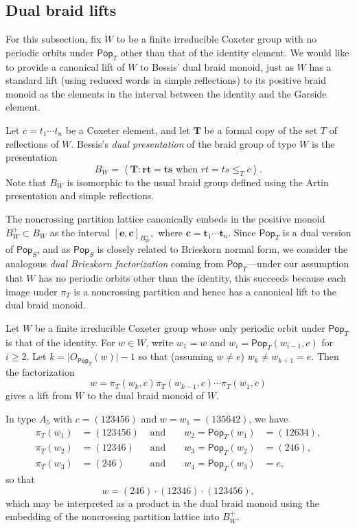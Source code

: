 \documentclass[ALCO,ThmDefs,Unicode,epreuves]{cedram}
\newcommand{\darkblue}{\color{darkblue}}
\newcommand{\defn}[1]{\emph{\darkblue #1}}
\newcommand{\pop}{\mathsf{Pop}}
\begin{document}
\subsection{Dual braid lifts}
\label{sec:lifts}
For this subsection, fix $W$ to be a finite irreducible Coxeter group with no periodic orbits under $\pop_T$ other than that of the identity element.  We would like to provide a canonical lift of $W$ to Bessis' dual braid monoid, just as $W$ has a standard lift (using reduced words in simple reflections) to its positive braid monoid as the elements in the interval between the identity and the Garside element.

Let $c=t_1\cdots t_n$ be a Coxeter element, and let $\mathbf{T}$ be a formal copy of the set $T$ of reflections of $W$. Bessis's \defn{dual presentation} of the braid group of type $W$ is the presentation
\[
B_W = \left\langle \mathbf{T} : \mathbf{r}\mathbf{t} = \mathbf{t}\mathbf{s} \text{ when } rt=ts \leq_T c\right \rangle.
\]
  Note that $B_W$ is isomorphic to the usual braid group defined using the Artin presentation and simple reflections.

The noncrossing partition lattice canonically embeds in the positive monoid $B^+_W \subset B_W$ as the interval $[\mathbf{e},\mathbf{c}]_{B^+_W},$ where $\mathbf{c} = \mathbf{t}_1\cdots \mathbf{t}_n$.    Since $\pop_T$ is a dual version of $\pop_S$, and as $\pop_S$ is closely related to Brieskorn normal form, we consider the analogous \defn{dual Brieskorn factorization} coming from $\pop_T$---under our assumption that $W$ has no periodic orbits other than the identity, this succeeds because each image under $\pi_T$ is a noncrossing partition and hence has a canonical lift to the dual braid monoid.

\begin{theorem}
\label{thm:normal_form}
Let $W$ be a finite irreducible Coxeter group whose only periodic orbit under $\pop_T$ is that of the identity.  For $w\in W$, write $w_1=w$ and $w_i=\pop_T(w_{i-1},c)$ for $i\geq 2$. Let $k=\lvert O_{\pop_T}(w)\rvert-1$ so that (assuming $w\neq e$) $w_k\neq w_{k+1}=e$.  Then the factorization 
\[
w=\pi_T(w_k,c)\pi_T(w_{k-1},c)\cdots\pi_T(w_1,c)
\]
 gives a lift from $W$ to the dual braid monoid of $W$.
\end{theorem}



\begin{exam}
In type $A_5$ with $c=(123456)$ and $w=w_1=(135642)$, we have
\begin{align*}
\pi_T(w_1)&= (123456) &\text{ and } &&w_2=\pop_T(w_1)&=(12634),\\
\pi_T(w_2)&= (12346) &\text{ and } &&w_3=\pop_T(w_2)&=(246),\\
\pi_T(w_3)&= (246) &\text{ and } &&w_4=\pop_T(w_3)&=e,
\end{align*}
so that
\[
w=(246) \cdot (12346) \cdot (123456),
\]
which may be interpreted as a product in the dual braid monoid using the embedding of the noncrossing partition lattice into $B_W^+$.
\end{exam}
\end{document}
